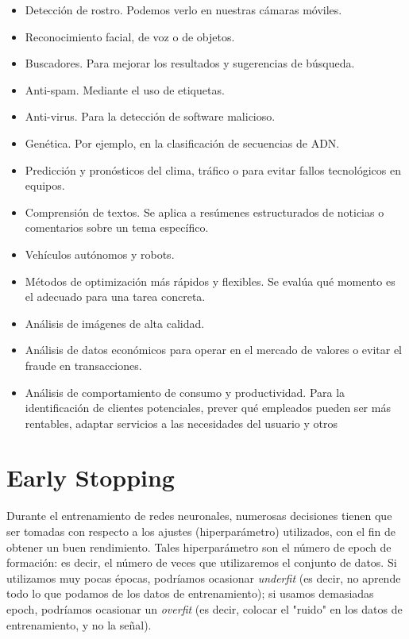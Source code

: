 \begin{itemize}
\item Detección de rostro. Podemos verlo en nuestras cámaras móviles.
\item Reconocimiento facial, de voz o de objetos.
\item 	Buscadores. Para mejorar los resultados y sugerencias de búsqueda.
\item Anti-spam. Mediante el uso de etiquetas.
\item Anti-virus. Para la detección de software malicioso.
\item Genética. Por ejemplo, en la clasificación de secuencias de ADN.

\item Predicción y pronósticos del clima, tráfico o para evitar fallos tecnológicos en
equipos.

\item Comprensión de textos. Se aplica a resúmenes estructurados de noticias o
comentarios sobre un tema específico.

\item Vehículos autónomos y robots.

\item Métodos de optimización más rápidos y flexibles. Se evalúa qué momento es el
adecuado para una tarea concreta.

\item Análisis de imágenes de alta calidad.

\item Análisis de datos económicos para operar en el mercado de valores o evitar el
fraude en transacciones.

\item Análisis de comportamiento de consumo y productividad. Para la identificación
de clientes potenciales, prever qué empleados pueden ser más rentables, adaptar
servicios a las necesidades del usuario y otros

\end{itemize}


\section{Early Stopping}

Durante el entrenamiento de redes neuronales, numerosas decisiones tienen que
ser tomadas con respecto a los ajustes (hiperparámetro) utilizados, con el fin de obtener
un buen rendimiento. Tales hiperparámetro son el número de epoch de formación: es
decir, el número de veces que utilizaremos el conjunto de datos. Si utilizamos muy pocas
épocas, podríamos ocasionar \textit{underfit} (es decir, no aprende todo lo que podamos de los
datos de entrenamiento); si usamos demasiadas epoch, podríamos ocasionar un \textit{overfit} (es decir, colocar el "ruido" en los datos de entrenamiento, y no la señal).

